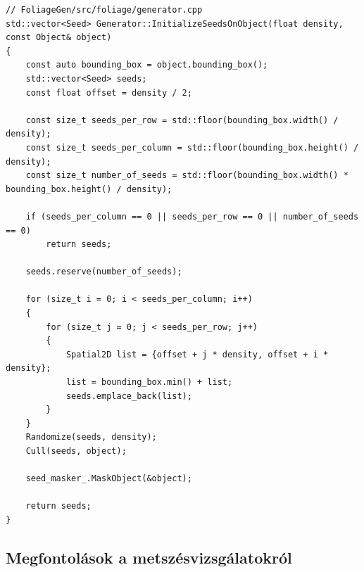 \begin{listing}[H]
\begin{verbatim}
// FoliageGen/src/foliage/generator.cpp
std::vector<Seed> Generator::InitializeSeedsOnObject(float density, const Object& object)
{
    const auto bounding_box = object.bounding_box();
    std::vector<Seed> seeds;
    const float offset = density / 2;

    const size_t seeds_per_row = std::floor(bounding_box.width() / density);
    const size_t seeds_per_column = std::floor(bounding_box.height() / density);
    const size_t number_of_seeds = std::floor(bounding_box.width() * bounding_box.height() / density);

    if (seeds_per_column == 0 || seeds_per_row == 0 || number_of_seeds == 0)
        return seeds;

    seeds.reserve(number_of_seeds);

    for (size_t i = 0; i < seeds_per_column; i++)
    {
        for (size_t j = 0; j < seeds_per_row; j++)
        {
            Spatial2D list = {offset + j * density, offset + i * density};
            list = bounding_box.min() + list;
            seeds.emplace_back(list);
        }
    }
    Randomize(seeds, density);
    Cull(seeds, object);

    seed_masker_.MaskObject(&object);

    return seeds;
}
\end{verbatim}
\caption{A függvény egy erdőn elhelyezkedő magok allokálását végzi el, azok különböző invariánsainak megőrzésének céljával.}
\end{listing}

\subsection{Megfontolások a metszésvizsgálatokról}

